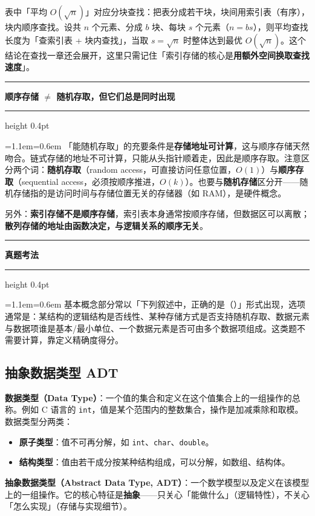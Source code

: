 \documentclass[11pt,openany,UTF8]{ctexbook}
\newcommand{\callouthead}[2]{%
  \par\addvspace{7pt}\noindent
  {\color{#1}\rule[-0.15em]{3pt}{1.05em}}\hspace{0.5em}%
  {\bfseries\color{#1}#2}\par\nobreak\vspace{-0.35em}%
  {\color{rulesep}\hrule height 0.4pt}\nobreak\vspace{0.45em}%
  \begingroup\small\setlength{\parindent}{0pt}%
  \leftskip=1.1em\rightskip=0.6em\noindent\ignorespaces}
\newcommand{\calloutend}{\par\endgroup\addvspace{7pt}}
\newenvironment{callwarn}[1]{\callouthead{warnbar}{#1}}{\calloutend}
\newenvironment{callexam}[1]{\callouthead{exambar}{#1}}{\calloutend}
\begin{document}
表中「平均 $O(\sqrt n)$」对应分块查找：把表分成若干块，块间用索引表（有序），块内顺序查找。设共 $n$ 个元素、分成 $b$ 块、每块 $s$ 个元素（$n=bs$），则平均查找长度为「查索引表 + 块内查找」，当取 $s=\sqrt n$ 时整体达到最优 $O(\sqrt n)$。这个结论在查找一章还会展开，这里只需记住「索引存储的核心是\textbf{用额外空间换取查找速度}」。

\begin{callwarn}{顺序存储 $\neq$ 随机存取，但它们总是同时出现}
「能随机存取」的充要条件是\textbf{存储地址可计算}，这与顺序存储天然吻合。链式存储的地址不可计算，只能从头指针顺着走，因此是顺序存取。注意区分两个词：\textbf{随机存取}（random access，可直接访问任意位置，$O(1)$）与\textbf{顺序存取}（sequential access，必须按顺序推进，$O(k)$）。也要与\textbf{随机存储}区分开——随机存储指的是访问时间与存储位置无关的存储器（如 RAM），是硬件概念。

另外：\textbf{索引存储不是顺序存储}，索引表本身通常按顺序存储，但数据区可以离散；\textbf{散列存储的地址由函数决定，与逻辑关系的顺序无关}。

\end{callwarn}

\begin{callexam}{真题考法}
基本概念部分常以「下列叙述中，正确的是（）」形式出现，选项通常是：某结构的逻辑结构是否线性、某种存储方式是否支持随机存取、数据元素与数据项谁是基本/最小单位、一个数据元素是否可由多个数据项组成。这类题不需要计算，靠定义精确度得分。

\end{callexam}

\subsection{抽象数据类型 ADT}

\textbf{数据类型（Data Type）}：一个值的集合和定义在这个值集合上的一组操作的总称。例如 C 语言的 \texttt{int}，值是某个范围内的整数集合，操作是加减乘除和取模。数据类型分两类：

\begin{itemize}
\item \textbf{原子类型}：值不可再分解，如 \texttt{int}、\texttt{char}、\texttt{double}。
\item \textbf{结构类型}：值由若干成分按某种结构组成，可以分解，如数组、结构体。
\end{itemize}
\textbf{抽象数据类型（Abstract Data Type, ADT）}：一个数学模型以及定义在该模型上的一组操作。它的核心特征是\textbf{抽象}——只关心「能做什么」（逻辑特性），不关心「怎么实现」（存储与实现细节）。
\end{document}

